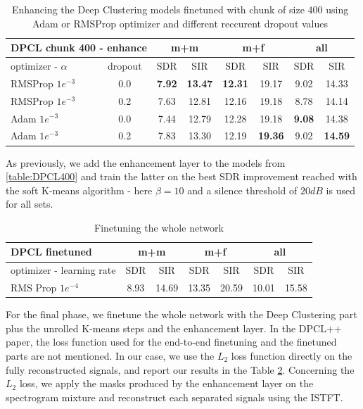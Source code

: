 \documentclass[master, tikz, final,11pt, dvipdfmx]{iscs-thesis}
\begin{document}
\begin{table}[h]
\centering
\begin{tabular}{l|c|c|c|c|c|c|c}
\multicolumn{2}{c|}{DPCL chunk 400 - enhance} & \multicolumn{2}{c|}{m+m} & \multicolumn{2}{c|}{m+f} & \multicolumn{2}{c}{all} \\ 
\hline 
optimizer - $\alpha$ & dropout & SDR & SIR & SDR & SIR & SDR & SIR \\ 
\hline 
RMSProp $1e^{-3}$ & 0.0 & \textbf{7.92} & \textbf{13.47} & \textbf{12.31} & 19.17 & 9.02 & 14.33 \\ 
RMSProp $1e^{-3}$ & 0.2 & 7.63 & 12.81 & 12.16 & 19.18 & 8.78 & 14.14 \\ 
Adam $1e^{-3}$ & 0.0 & 7.44 & 12.79 & 12.28 & 19.18 & \textbf{9.08} & 14.38 \\
Adam $1e^{-3}$ & 0.2 & 7.83 & 13.30 & 12.19 & \textbf{19.36} & 9.02 & \textbf{14.59}\\ 
\end{tabular}
\captionsetup{justification=centering}
\caption{Enhancing the Deep Clustering models finetuned with chunk of size 400 using Adam or RMSProp optimizer and different reccurent dropout values}
\label{table:DPCL400enh}
\end{table}

As previously, we add the enhancement layer to the models from \ref{table:DPCL400} and train the latter on the best SDR improvement reached with the soft K-means algorithm - here $\beta = 10$ and a silence threshold of $20dB$ is used for all sets. 

\begin{table}[h]
\centering
\begin{tabular}{l|c|c|c|c|c|c}
DPCL finetuned & \multicolumn{2}{c|}{m+m} & \multicolumn{2}{c|}{m+f} & \multicolumn{2}{c}{all} \\ 
\hline 
 optimizer - learning rate & SDR & SIR & SDR & SIR & SDR & SIR \\ 
\hline 
RMS Prop $1e^{-4}$  & 8.93 & 14.69 & 13.35 & 20.59 & 10.01 & 15.58 \\ 

\end{tabular}
\captionsetup{justification=centering}
\caption{Finetuning the whole network}
\label{table:DPCL400fine}
\end{table}

For the final phase, we finetune the whole network with the Deep Clustering part plus the unrolled K-means steps and the enhancement layer. In the DPCL++ paper, the loss function used for the end-to-end finetuning and the finetuned parts are not mentioned. In our case, we use the $L_2$ loss function directly on the fully reconstructed signals, and report our results in the Table \ref{table:DPCL400fine}. Concerning the $L_2$ loss, we apply the masks produced by the enhancement layer on the spectrogram mixture and reconstruct each separated signals using the ISTFT.
\end{document}
